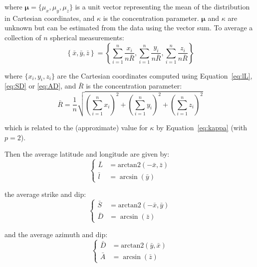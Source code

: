 \noindent where $\mathbf{\mu}=\{\mu_x,\mu_y,\mu_z\}$ is a unit vector
representing the mean of the distribution in Cartesian coordinates,
and $\kappa$ is the concentration parameter. $\mathbf{\mu}$ and
$\kappa$ are unknown but can be estimated from the data using the
vector sum. To average a collection of $n$ spherical measurements:
\begin{equation}
  \left\{\bar{x},\bar{y},\bar{z}\right\} =
  \left\{\sum_{i=1}^{n}\frac{x_i}{n\bar{R}},
  \sum_{i=1}^{n}\frac{y_i}{n\bar{R}},
  \sum_{i=1}^{n}\frac{z_i}{n\bar{R}}
  \right\}
  \label{eq:3Dvectormean}
\end{equation}

\noindent where $\{x_i,y_i,z_i\}$ are the Cartesian coordinates
computed using Equation~\ref{eq:lL}, \ref{eq:SD} or \ref{eq:AD},
and $\bar{R}$ is the concentration parameter:
\begin{equation}
  \bar{R} = \frac{1}{n}
    \sqrt{\left(\sum_{i=1}^{n}x_i\right)^2 +
      \left(\sum_{i=1}^{n}y_i\right)^2 +
      \left(\sum_{i=1}^{n}z_i\right)^2
    }
\end{equation}

\noindent which is related to the (approximate) value for $\kappa$ by
Equation~\ref{eq:kappa} (with $p=2$).

Then the average latitude and longitude are given by:
\begin{equation}
  \left\{
  \begin{split}
  \bar{L} & = \mbox{arctan2}\left(-\bar{x},\bar{z}\right)\\
  \bar{l} & = \arcsin\left(\bar{y}\right)
  \end{split}
  \right.
\end{equation}

\noindent the average strike and dip:
\begin{equation}
  \left\{
  \begin{split}
    \bar{S} & = \mbox{arctan2}\left(-\bar{x},\bar{y}\right)\\
    \bar{D} & = \arcsin\left(\bar{z}\right)
  \end{split}
  \right.
\end{equation}

\noindent and the average azimuth and dip:
\begin{equation}
  \left\{
  \begin{split}
    \bar{D} & = \mbox{arctan2}\left(\bar{y},\bar{x}\right)\\
    \bar{A} & = \arcsin\left(\bar{z}\right)
  \end{split}
  \right.
\end{equation}

